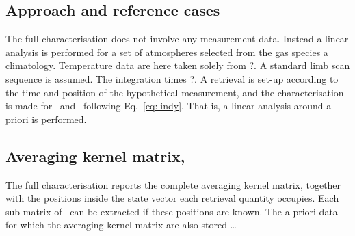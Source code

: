 \subsection{Approach and reference cases}
\label{sec:fullchar:select}
%
The full characterisation does not involve any measurement data. Instead a
linear analysis is performed for a set of atmospheres selected from the gas
species a climatology. Temperature data are here taken solely from
?. A standard limb scan sequence is assumed. The integration times
?. A retrieval is set-up according to the time and
position of the hypothetical measurement, and the characterisation is made for
\aWfnMtr{\SttVct}\ and \CtrFncMtr\ following Eq.~\ref{eq:lindy}. That is, a
linear analysis around a priori is performed.
\\


\subsection{Averaging kernel matrix, \AvrKrnMtr}
\label{sec:A}
%
The full characterisation reports the complete averaging kernel matrix,
together with the positions inside the state vector each retrieval quantity
occupies. Each sub-matrix of \AvrKrnMtr\ can be extracted if these positions
are known. The a priori data for which the averaging kernel matrix are also
stored \dots 
\\


